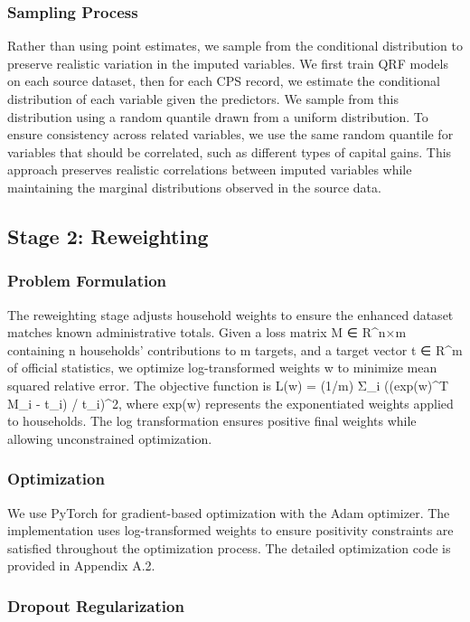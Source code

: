 \subsubsection{Sampling Process}

Rather than using point estimates, we sample from the conditional distribution to preserve realistic variation in the imputed variables. We first train QRF models on each source dataset, then for each CPS record, we estimate the conditional distribution of each variable given the predictors. We sample from this distribution using a random quantile drawn from a uniform distribution. To ensure consistency across related variables, we use the same random quantile for variables that should be correlated, such as different types of capital gains. This approach preserves realistic correlations between imputed variables while maintaining the marginal distributions observed in the source data.

\subsection{Stage 2: Reweighting}

\subsubsection{Problem Formulation}

The reweighting stage adjusts household weights to ensure the enhanced dataset matches known administrative totals. Given a loss matrix M ∈ R^{n×m} containing n households' contributions to m targets, and a target vector t ∈ R^m of official statistics, we optimize log-transformed weights w to minimize mean squared relative error. The objective function is L(w) = (1/m) Σ\_i ((exp(w)^T M\_i - t\_i) / t\_i)^2, where exp(w) represents the exponentiated weights applied to households. The log transformation ensures positive final weights while allowing unconstrained optimization.

\subsubsection{Optimization}

We use PyTorch for gradient-based optimization with the Adam optimizer. The implementation uses log-transformed weights to ensure positivity constraints are satisfied throughout the optimization process. The detailed optimization code is provided in Appendix A.2.

\subsubsection{Dropout Regularization}

